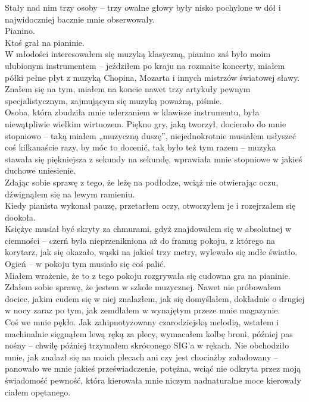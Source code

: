 \documentclass[../MAIN.tex]{subfiles}
\begin{document}
Stały nad nim trzy osoby -- trzy owalne głowy były nisko pochylone w dół i najwidoczniej bacznie mnie obserwowały.\\
%
%
Pianino.\\
Ktoś grał na pianinie.\\
W młodości interesowałem się muzyką klasyczną, pianino zaś było moim ulubionym instrumentem -- jeździłem po kraju na rozmaite koncerty, miałem półki pełne płyt z muzyką Chopina, Mozarta i innych mistrzów światowej sławy. Znałem się na tym, miałem na koncie nawet trzy artykuły pewnym specjalistycznym, zajmującym się muzyką poważną, piśmie.\\
Osoba, która zbudziła mnie uderzaniem w klawisze instrumentu, była niewątpliwie wielkim wirtuozem. Piękno gry, jaką tworzył, docierało do mnie stopniowo -- taką miałem „muzyczną duszę”, niejednokrotnie musiałem usłyszeć coś kilkanaście razy, by móc to docenić, tak było też tym razem -- muzyka stawała się piękniejsza z sekundy na sekundę, wprawiała mnie stopniowe w jakieś duchowe uniesienie.\\
Zdając sobie sprawę z tego, że leżę na podłodze, wciąż nie otwierając oczu, dźwignąłem się na lewym ramieniu.\\
Kiedy pianista wykonał pauzę, przetarłem oczy, otworzyłem je i rozejrzałem się dookoła.\\
Księżyc musiał być skryty za chmurami, gdyż znajdowałem się w absolutnej w ciemności -- czerń była nieprzenikniona aż do framug pokoju, z którego na korytarz, jak się okazało, wąski na jakieś trzy metry, wylewało się mdłe światło. Ogień -- w pokoju tym musiało się coś palić.\\
Miałem wrażenie, że to z tego pokoju rozgrywała się cudowna gra na pianinie.\\
Zdałem sobie sprawę, że jestem w szkole muzycznej. Nawet nie próbowałem dociec, jakim cudem się w niej znalazłem, jak się domyślałem, dokładnie o drugiej w nocy zaraz po tym, jak zemdlałem w wynajętym przeze mnie magazynie.\\
Coś we mnie pękło. Jak zahipnotyzowany czarodziejską melodią, wstałem i machinalnie sięgnąłem lewą ręką za plecy, wymacałem kolbę broni, później pas nośny -- chwilę później trzymałem skróconego SIG’a w rękach. Nie obchodziło mnie, jak znalazł się na moich plecach ani czy jest chociażby załadowany -- panowało we mnie jakieś przeświadczenie, potężna, wciąć nie odkryta przez moją świadomość pewność, która kierowała mnie niczym nadnaturalne moce kierowały ciałem opętanego.\\
\end{document}
